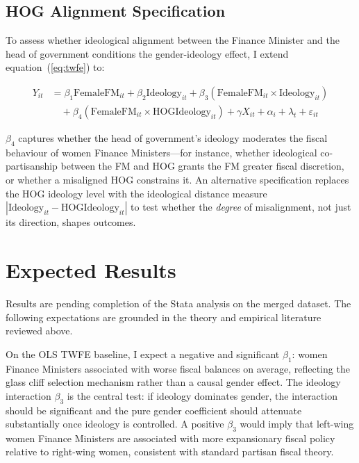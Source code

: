 \documentclass[12pt]{article}
\begin{document}
\subsection{HOG Alignment Specification}
\label{sec:hogalign}

To assess whether ideological alignment between the Finance Minister and the
head of government conditions the gender-ideology effect, I extend
equation~(\ref{eq:twfe}) to:

\begin{align}
\label{eq:extended}
Y_{it} &= \beta_1 \text{FemaleFM}_{it} + \beta_2 \text{Ideology}_{it}
        + \beta_3 (\text{FemaleFM}_{it} \times \text{Ideology}_{it}) \nonumber \\
       &\quad + \beta_4 (\text{FemaleFM}_{it} \times \text{HOGIdeology}_{it})
        + \gamma X_{it} + \alpha_i + \lambda_t + \varepsilon_{it}
\end{align}

$\beta_4$ captures whether the head of government's ideology moderates the
fiscal behaviour of women Finance Ministers---for instance, whether ideological
co-partisanship between the FM and HOG grants the FM greater fiscal discretion,
or whether a misaligned HOG constrains it. An alternative specification
replaces the HOG ideology level with the ideological distance measure
$|\text{Ideology}_{it} - \text{HOGIdeology}_{it}|$ to test whether the
\textit{degree} of misalignment, not just its direction, shapes outcomes.

\section{Expected Results}
\label{sec:results}

Results are pending completion of the Stata analysis on the merged dataset.
The following expectations are grounded in the theory and empirical literature
reviewed above.

On the OLS TWFE baseline, I expect a negative and significant $\beta_1$:
women Finance Ministers associated with worse fiscal balances on average,
reflecting the glass cliff selection mechanism rather than a causal gender
effect. The ideology interaction $\beta_3$ is the central test: if ideology
dominates gender, the interaction should be significant and the pure gender
coefficient should attenuate substantially once ideology is controlled. A
positive $\beta_3$ would imply that left-wing women Finance Ministers are
associated with more expansionary fiscal policy relative to right-wing women,
consistent with standard partisan fiscal theory.
\end{document}
